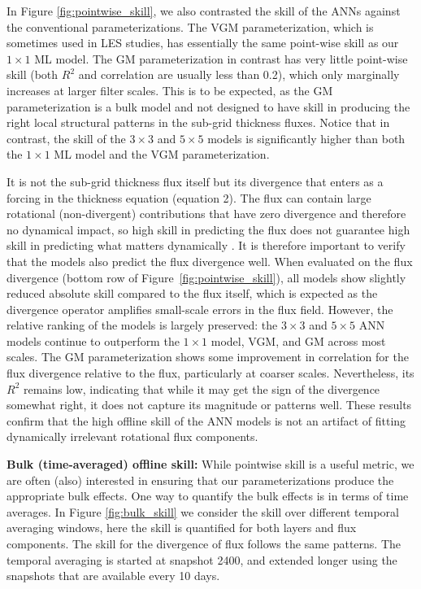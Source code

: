 \documentclass[draft]{agujournal2019}
\begin{document}
In Figure \ref{fig:pointwise_skill}, we also contrasted the skill of the ANNs against the conventional parameterizations. The VGM parameterization, which is sometimes used in LES studies, has essentially the same point-wise skill as our $1\times1$ ML model. The GM parameterization in contrast has very little point-wise skill (both $R^2$ and correlation are usually less than 0.2), which only marginally increases at larger filter scales. This is to be expected, as the GM parameterization is a bulk model and not designed to have skill in producing the right local structural patterns in the sub-grid thickness fluxes. Notice that in contrast, the skill of the $3\times3$ and $5\times5$ models is significantly higher than both the $1\times1$ ML model and the VGM parameterization. 

It is not the sub-grid thickness flux itself but its divergence that enters as a forcing in the thickness equation (equation 2). The flux can contain large rotational (non-divergent) contributions that have zero divergence and therefore no dynamical impact, so high skill in predicting the flux does not guarantee high skill in predicting what matters dynamically \cite{marshall1981note}. It is therefore important to verify that the models also predict the flux divergence well. When evaluated on the flux divergence (bottom row of Figure~\ref{fig:pointwise_skill}), all models show slightly reduced absolute skill compared to the flux itself, which is expected as the divergence operator amplifies small-scale errors in the flux field. However, the relative ranking of the models is largely preserved: the $3\times3$ and $5\times5$ ANN models continue to outperform the $1\times1$ model, VGM, and GM across most scales. The GM parameterization shows some improvement in correlation for the flux divergence relative to the flux, particularly at coarser scales. Nevertheless, its $R^2$ remains low, indicating that while it may get the sign of the divergence somewhat right, it does not capture its magnitude or patterns well. These results confirm that the high offline skill of the ANN models is not an artifact of fitting dynamically irrelevant rotational flux components.

\textbf{Bulk (time-averaged) offline skill:}
While pointwise skill is a useful metric, we are often (also) interested in ensuring that our parameterizations produce the appropriate bulk effects. One way to quantify the bulk effects is in terms of time averages. In Figure \ref{fig:bulk_skill} we consider the skill over different temporal averaging windows, here the skill is quantified for both layers and flux components. The skill for the divergence of flux follows the same patterns.
The temporal averaging is started at snapshot 2400, and extended longer using the snapshots that are available every 10 days.
\end{document}
